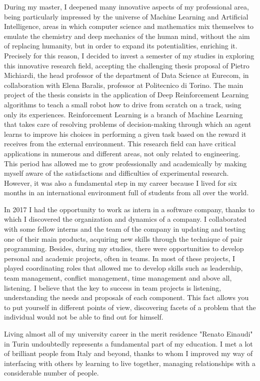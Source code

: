 \documentclass[11pt, a4paper]{dogear-cv}
\begin{document}
\begin{cvletter}
During my master, I deepened many innovative aspects of my professional area, being particularly impressed by the universe of Machine Learning and Artificial Intelligence, areas in which computer science and mathematics mix themselves to emulate the chemistry and deep mechanics of the human mind, without the aim of replacing humanity, but in order to expand its potentialities, enriching it.
Precisely for this reason, I decided to invest a semester of my studies in exploring this innovative research field, accepting the challenging thesis proposal of Pietro Michiardi, the head professor of the department of Data Science at Eurecom, in collaboration with Elena Baralis, professor at Politecnico di Torino.
The main project of the thesis consists in the application of Deep Reinforcement Learning algorithms to teach a small robot how to drive from scratch on a track, using only its experiences. Reinforcement Learning is a branch of Machine Learning that takes care of resolving problems of decision-making through which an agent learns to improve his choices in performing a given task based on the reward it receives from the external environment. This research field can have critical applications in numerous and different areas, not only related to engineering. 
This period has allowed me to grow professionally and academically by making myself aware of the satisfactions and difficulties of experimental research. However, it was also a fundamental step in my career because I lived for six months in an international environment full of students from all over the world.

In 2017 I had the opportunity to work as intern in a software company, thanks to which I discovered the organization and dynamics of a company. I collaborated with some fellow interns and the team of the company in updating and testing one of their main products, acquiring new skills through the technique of pair programming.
Besides, during my studies, there were opportunities to develop personal and academic projects, often in teams. In most of these projects, I played coordinating roles that allowed me to develop skills such as leadership, team management, conflict management, time management and above all, listening. I believe that the key to success in team projects is listening, understanding the needs and proposals of each component. This fact allows you to put yourself in different points of view, discovering facets of a problem that the individual would not be able to find out for himself.

Living almost all of my university career in the merit residence "Renato Einaudi" in Turin undoubtedly represents a fundamental part of my education. I met a lot of brilliant people from Italy and beyond, thanks to whom I improved my way of interfacing with others by learning to live together, managing relationships with a considerable number of people.


\end{cvletter}
\end{document}
